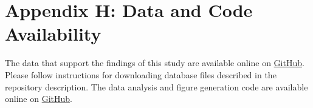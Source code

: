 \documentclass[%
  reprint,
  amsmath,amssymb,
  aps,
  prapplied,
  superscriptaddress,
  longbibliography]{revtex4-2}
\begin{document}
\section{\label{appendix:e} Appendix H: Data and Code Availability}

The data that support the findings of this study are available online on \href{https://github.com/Alex-Carney/EP_TPD_Unification}{GitHub}. Please follow instructions for downloading database files described in the repository description. The data analysis and figure generation code are available online on \href{https://github.com/Alex-Carney/EP_TPD_Unification}{GitHub}. 



\end{document}
